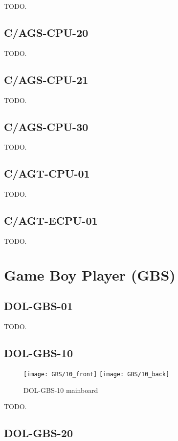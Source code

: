 TODO.

\subsection{C/AGS-CPU-20}

TODO.

\subsection{C/AGS-CPU-21}

TODO.

\subsection{C/AGS-CPU-30}

TODO.

\subsection{C/AGT-CPU-01}

TODO.

\subsection{C/AGT-ECPU-01}

TODO.

\section{Game Boy Player (GBS)}

\subsection{DOL-GBS-01}

TODO.

\subsection{DOL-GBS-10}

\begin{figure}[H]
  \centering
  \texttt{[image: GBS/10\_front]}
  \texttt{[image: GBS/10\_back]}
  \caption{DOL-GBS-10 mainboard}
\end{figure}

TODO.

\subsection{DOL-GBS-20}

